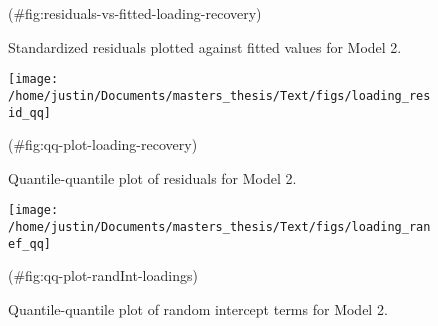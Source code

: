 \begin{appendix}
\begin{figure}
{}

\caption{Standardized residuals plotted against fitted values for Model 2.}(\#fig:residuals-vs-fitted-loading-recovery)
\end{figure}

\begin{figure}

{\centering \texttt{[image: /home/justin/Documents/masters\_thesis/Text/figs/loading\_resid\_qq]} 

}

\caption{Quantile-quantile plot of residuals for Model 2.}(\#fig:qq-plot-loading-recovery)
\end{figure}

\begin{figure}

{\centering \texttt{[image: /home/justin/Documents/masters\_thesis/Text/figs/loading\_ranef\_qq]} 

}

\caption{Quantile-quantile plot of random intercept terms for Model 2.}(\#fig:qq-plot-randInt-loadings)
\end{figure}
\end{appendix}
